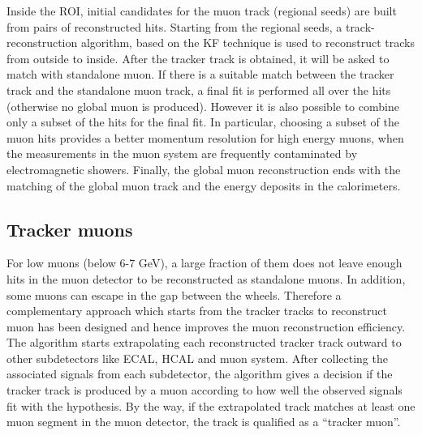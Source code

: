 Inside the ROI, initial candidates for the muon track (regional seeds) are built from pairs of reconstructed hits. Starting from the regional seeds, a track-reconstruction algorithm, based on the KF technique is used to reconstruct tracks from outside to inside. After the tracker track is obtained, it will be asked to match with standalone muon. If there is a suitable match between the tracker track and the standalone muon track, a final fit is performed all over the hits (otherwise no global muon is produced). However it is also possible to combine only a subset of the hits for the final fit. In particular, choosing a subset of the muon hits provides a better momentum resolution for high energy muons, when the measurements in the muon system are frequently contaminated by electromagnetic showers. Finally, the global muon reconstruction ends with the matching of the global muon track and the energy deposits in the calorimeters.

\subsection*{Tracker muons}\label{subsec:Tracker_muon}
For low \et muons (below 6-7 GeV), a large fraction of them does not leave enough hits in the muon detector to be reconstructed as standalone muons. In addition, some muons can escape in the gap between the wheels. Therefore a complementary approach which starts from the tracker tracks to reconstruct muon has been
designed \cite{muon_reco_2} and hence improves the muon reconstruction efficiency. The algorithm starts extrapolating each reconstructed tracker track outward to other subdetectors like ECAL, HCAL and muon system. After collecting the associated signals from each subdetector, the algorithm gives a decision if the tracker track is produced by a muon according to how well the observed signals fit with the hypothesis. By the way, if the extrapolated track matches at least one muon segment in the muon detector, the track is qualified as a ``tracker muon''.



